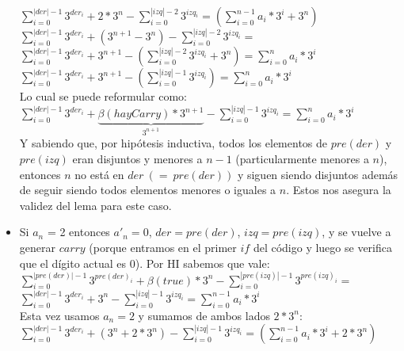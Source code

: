 \begin{itemize}
	$\sum_{i=0}^{|der|-1} 3^{der_i} + 2*3^{n} - \sum_{i=0}^{|izq|-2} 3^{izq_i} = (\sum_{i=0}^{n-1} a_i*3^{i} + 3^{n}) $
	\\

	$\sum_{i=0}^{|der|-1} 3^{der_i} + (3^{n+1}-3^{n}) - \sum_{i=0}^{|izq|-2} 3^{izq_i} = $
	\\

	$\sum_{i=0}^{|der|-1} 3^{der_i} + 3^{n+1} - (\sum_{i=0}^{|izq|-2} 3^{izq_i} + 3^{n}) = \sum_{i=0}^{n} a_i*3^{i} $	\\

	$\sum_{i=0}^{|der|-1} 3^{der_i} + 3^{n+1} - (\sum_{i=0}^{|izq|-1} 3^{izq_i}) = \sum_{i=0}^{n} a_i*3^{i} $
	\\

	Lo cual se puede reformular como: \\

	$\sum_{i=0}^{|der|-1} 3^{der_i} + \underbrace{\beta(hayCarry)*3^{n+1}}_\text{$3^{n+1}$} - \sum_{i=0}^{|izq|-1} 3^{izq_i} = \sum_{i=0}^{n} a_i*3^{i} $
	\\

	Y sabiendo que, por hipótesis inductiva, todos los elementos de $pre(der)$ y $pre(izq)$ eran disjuntos y menores a $n-1$ (particularmente menores a $n$), entonces $n$ no está en $der\ (=\ pre(der))$ y siguen siendo disjuntos además de seguir siendo todos elementos menores o iguales a $n$. Estos nos asegura la validez del lema para este caso.

	\item Si $a_n$ = 2 entonces $a'_n = 0$, $der = pre(der)$, $izq = pre(izq)$, y se vuelve a generar $carry$ (porque entramos en el primer $if$ del código y luego se verifica que el dígito actual es 0). Por HI sabemos que vale: \\

	$\sum_{i=0}^{|pre(der)|-1} 3^{pre(der)_i} + \beta(true)*3^{n} - \sum_{i=0}^{|pre(izq)|-1} 3^{pre(izq)_i} =$
	\\

	$\sum_{i=0}^{|der|-1} 3^{der_i} + 3^{n} - \sum_{i=0}^{|izq|-1} 3^{izq_i} = \sum_{i=0}^{n-1} a_i*3^{i} $
	\\

	Esta vez usamos $a_n = 2$ y sumamos de ambos lados $2*3^n$:
	\\

	$\sum_{i=0}^{|der|-1} 3^{der_i} + (3^{n} + 2*3^{n}) - \sum_{i=0}^{|izq|-1} 3^{izq_i} = (\sum_{i=0}^{n-1} a_i*3^{i} + 2*3^{n}) $
	\\


\end{itemize}
